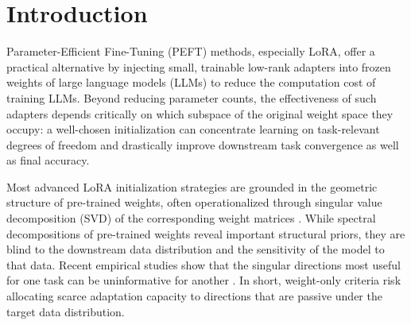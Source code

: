 \documentclass{article}
\theoremstyle{plain}
\theoremstyle{definition}
\theoremstyle{remark}
\begin{document}
\begin{abstract}

LoRA adapts large language models (LLMs) by restricting updates to low-rank subspaces of pre-trained weights. While this substantially reduces training cost, the effectiveness of adaptation critically depends on which subspace is chosen at initialization: a poor initialization that allocates capacity to task-irrelevant directions can severely hinder downstream performance. Existing initialization strategies primarily rely on the intrinsic properties of pre-trained weights, implicitly assuming that weight geometry alone reflects task relevance. However, such criteria overlook how the model interacts with the downstream data distribution. In this work, we formulate LoRA initialization as identifying the degree of impact of directions in parameter space under the target data distribution. We argue that data-aware sensitivity, rather than weight-only magnitude, should govern the choice of adaptation subspaces. Building on this perspective, we propose a Fisher-guided framework that leverages curvature information induced by downstream data to characterize how parameter perturbations influence model predictions. This perspective yields a principled, task-dependent criterion for selecting LoRA directions that better align adaptation with the target objective. Empirical results across diverse tasks and modalities demonstrate that data-aware initialization consistently and significantly improves downstream performance over existing approaches.

\end{abstract}



\section{Introduction}

Parameter-Efficient Fine-Tuning (PEFT) methods, especially LoRA, offer a practical alternative by injecting small, trainable low-rank adapters into frozen weights of large language models (LLMs) to reduce the computation cost of training LLMs. Beyond reducing parameter counts, the effectiveness of such adapters depends critically on which subspace of the original weight space they occupy: a well-chosen initialization can concentrate learning on task-relevant degrees of freedom and drastically improve downstream task convergence as well as final accuracy.

Most advanced LoRA initialization strategies are grounded in the geometric structure of pre-trained weights, often operationalized through singular value decomposition (SVD) of the corresponding weight matrices \cite{PISSA,MILORA,KASA}. While spectral decompositions of pre-trained weights reveal important structural priors, they are blind to the downstream data distribution and the sensitivity of the model to that data. Recent empirical studies show that the singular directions most useful for one task can be uninformative for another \cite{GOAT}. In short, weight-only criteria risk allocating scarce adaptation capacity to directions that are passive under the target data distribution.
\end{document}
